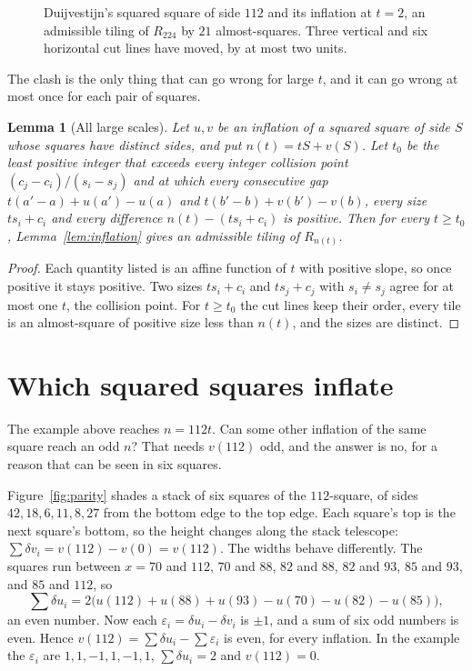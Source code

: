 \documentclass[11pt]{amsart}
\newtheorem{lem}[thm]{Lemma}
\theoremstyle{definition}
\newcommand{\R}{R}
\begin{document}
\begin{figure}[ht]
\centering

\caption{Duijvestijn's squared square of side $112$ and its inflation at $t=2$, an admissible tiling
of $\R_{224}$ by $21$ almost-squares. Three vertical and six horizontal cut lines have moved, by at
most two units.}
\label{fig:inflate}
\end{figure}

The clash is the only thing that can go wrong for large $t$, and it can go wrong at most once for
each pair of squares.

\begin{lem}[All large scales]\label{lem:scales}
Let $u,v$ be an inflation of a squared square of side $S$ whose squares have distinct sides, and put
$n(t)=tS+v(S)$. Let $t_0$ be the least positive integer that exceeds every integer collision point
$(c_j-c_i)/(s_i-s_j)$ and at which every consecutive gap $t(a'-a)+u(a')-u(a)$ and
$t(b'-b)+v(b')-v(b)$, every size $ts_i+c_i$ and every difference $n(t)-(ts_i+c_i)$ is positive. Then
for every $t\ge t_0$, Lemma~\ref{lem:inflation} gives an admissible tiling of $\R_{n(t)}$.
\end{lem}

\begin{proof}
Each quantity listed is an affine function of $t$ with positive slope, so once positive it stays
positive. Two sizes $ts_i+c_i$ and $ts_j+c_j$ with $s_i\ne s_j$ agree for at most one $t$, the
collision point. For $t\ge t_0$ the cut lines keep their order, every tile is an almost-square of
positive size less than $n(t)$, and the sizes are distinct.
\end{proof}

\section{Which squared squares inflate}\label{sec:parity}

The example above reaches $n=112t$. Can some other inflation of the same square reach an odd $n$?
That needs $v(112)$ odd, and the answer is no, for a reason that can be seen in six squares.

Figure~\ref{fig:parity} shades a stack of six squares of the $112$-square, of sides $42,18,6,11,8,27$
from the bottom edge to the top edge. Each square's top is the next square's bottom, so the height
changes along the stack telescope: $\sum\delta v_i=v(112)-v(0)=v(112)$. The widths behave
differently. The squares run between $x=70$ and $112$, $70$ and $88$, $82$ and $88$, $82$ and $93$,
$85$ and $93$, and $85$ and $112$, so
\[
\sum\delta u_i=2\bigl(u(112)+u(88)+u(93)-u(70)-u(82)-u(85)\bigr),
\]
an even number. Now each $\varepsilon_i=\delta u_i-\delta v_i$ is $\pm1$, and a sum of six odd numbers
is even. Hence $v(112)=\sum\delta u_i-\sum\varepsilon_i$ is even, for every inflation. In the example
the $\varepsilon_i$ are $1,1,-1,1,-1,1$, $\sum\delta u_i=2$ and $v(112)=0$.
\end{document}
